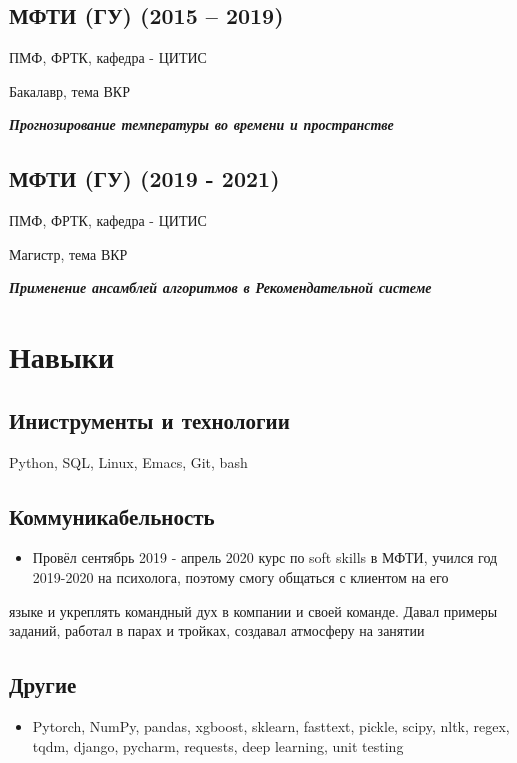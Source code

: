 \documentclass[11pt]{article}
\begin{document}
\subsection{МФТИ (ГУ) (2015 – 2019)}
\label{sec:orgee00e1f}
ПМФ, ФРТК, кафедра - ЦИТИС

Бакалавр, тема ВКР

\begin{center}
\textbf{\emph{Прогнозирование температуры во времени и пространстве}}
\end{center}
\subsection{МФТИ (ГУ) (2019 - 2021)}
\label{sec:org803de67}
ПМФ, ФРТК, кафедра - ЦИТИС

Магистр, тема ВКР
\begin{center}
\textbf{\emph{Применение ансамблей алгоритмов в Рекомендательной системе}}
\end{center}

\section{Навыки}
\label{sec:orgd9d1b0e}
\subsection{Иниструменты и технологии}
\label{sec:org4cc52f8}
Python, SQL, Linux, Emacs, Git, bash
\subsection{Коммуникабельность}
\label{sec:org214a364}
\begin{itemize}
\item Провёл сентябрь 2019 - апрель 2020 курс по soft skills в МФТИ, учился год 2019-2020 на психолога, поэтому смогу общаться с клиентом на его
\end{itemize}
языке и укреплять командный дух в компании и своей команде. Давал примеры заданий, работал в парах и тройках, создавал атмосферу на занятии
\subsection{Другие}
\label{sec:org9f8f9a6}
\begin{itemize}
\item Pytorch, NumPy, pandas, xgboost, sklearn, fasttext, pickle, scipy, nltk, regex, tqdm, django, pycharm, requests, deep learning, unit testing
\end{itemize}
\end{document}
